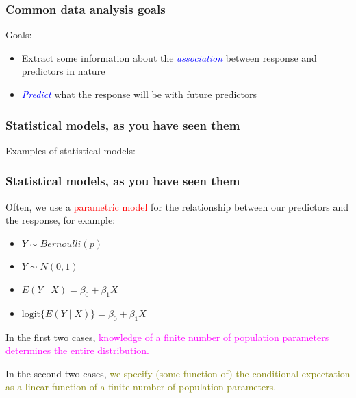 \documentclass[12pt, 
hyperref={colorlinks=true, linkcolor=blue, urlcolor=cyan},dvipsnames]{beamer}
\begin{document}
\begin{frame}
\frametitle{Common data analysis goals}
\begin{center}
\end{center}

Goals: \vspace{-0.3cm}
\begin{itemize}
\item Extract some information about the \textcolor{blue}{\textit{association}} between response and predictors in nature
\item \textcolor{blue}{\textit{Predict}} what the response will be with future predictors
\end{itemize} 
\end{frame}

\begin{frame}
\frametitle{Statistical models, as you have seen them}
Examples of statistical models: \vspace{6cm}
\end{frame}

\begin{frame}
\frametitle{Statistical models, as you have seen them}
Often, we use a \textcolor{red}{parametric model} for the relationship between our predictors and the response, for example: \vspace{-0.3cm}
\begin{itemize}
\item $Y \sim Bernoulli(p)$ 
\item $Y \sim N(0, 1)$
\item $E(Y \mid X) = \beta_0 + \beta_1 X$ 
\item $\text{logit} \{E(Y \mid X)\} = \beta_0 + \beta_1 X$
\end{itemize}

In the first two cases, \textcolor{magenta}{knowledge of a finite number of population parameters determines the entire distribution.}

In the second two cases, \textcolor{olive}{we specify (some function of) the conditional expectation as a linear function of a finite number of population parameters.}
\end{frame}
\end{document}
